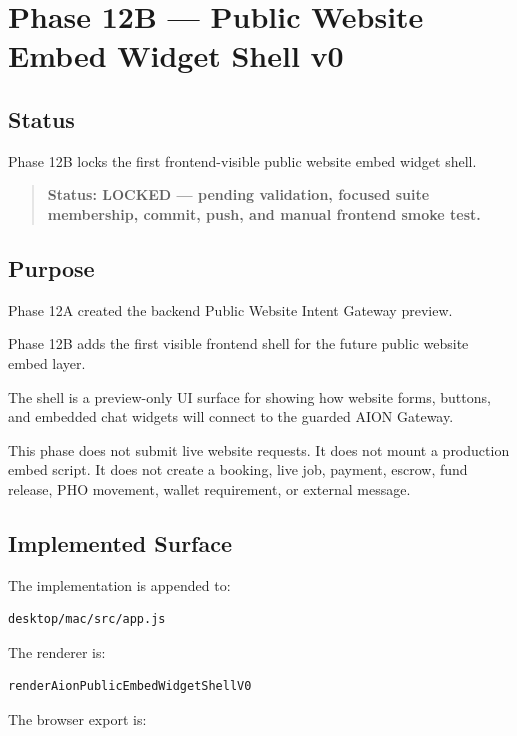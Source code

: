 \section{Phase 12B --- Public Website Embed Widget Shell v0}
\label{sec:aion-public-embed-widget-shell-v0}

\subsection{Status}

Phase 12B locks the first frontend-visible public website embed widget shell.

\begin{quote}
\textbf{Status: LOCKED --- pending validation, focused suite membership, commit, push, and manual frontend smoke test.}
\end{quote}

\subsection{Purpose}

Phase 12A created the backend Public Website Intent Gateway preview.

Phase 12B adds the first visible frontend shell for the future public website embed layer.

The shell is a preview-only UI surface for showing how website forms, buttons, and embedded chat widgets will connect to the guarded AION Gateway.

This phase does not submit live website requests. It does not mount a production embed script. It does not create a booking, live job, payment, escrow, fund release, PHO movement, wallet requirement, or external message.

\subsection{Implemented Surface}

The implementation is appended to:

\begin{verbatim}
desktop/mac/src/app.js
\end{verbatim}

The renderer is:

\begin{verbatim}
renderAionPublicEmbedWidgetShellV0
\end{verbatim}

The browser export is:

